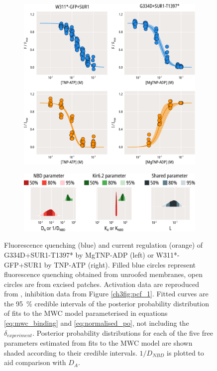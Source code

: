 \begin{figure}[h]
	\centering
	\begin{subfigure}[t]{0.9\textwidth}
		\caption{}\label{ch7fig:activation_fit_1}
		\centering
		\includegraphics[width=\textwidth]{activation_fit_1.pdf}
	\end{subfigure}
	\vfill
	\begin{subfigure}[t]{0.9\textwidth}
		\caption{}\label{ch7fig:activation_params_1}
		\centering
		\includegraphics[width=\textwidth]{activation_params_1.pdf}
	\end{subfigure}
	\caption[TNP-ATP inhibits K\ATP{} more strongly than MgTNP-ADP activates it]{
	 Fluorescence quenching (blue) and current regulation (orange) of G334D+SUR1-T1397* by MgTNP-ADP (left) or W311*-GFP+SUR1 by TNP-ATP (right).
	Filled blue circles represent fluorescence quenching obtained from unroofed membranes, open circles are from excised patches.
	Activation data are reproduced from \textcite{puljung_activation_2019}, inhibition data from Figure \ref{ch3fig:pcf_1}.
	Fitted curves are the \SI{95}{\percent} credible intervals of the posterior probability distribution of fits to the MWC model parameterised in equations \ref{eq:mwc_binding} and \ref{eq:normalised_po}, not including the $\delta_{experiment}$.
	 Posterior probability distributions for each of the five free parameters estimated from fits to the MWC model are shown shaded according to their credible intervals.
	$1/D_{NBD}$ is plotted to aid comparison with $D_A$.
	}\label{ch7fig:activation_fits}
\end{figure}


